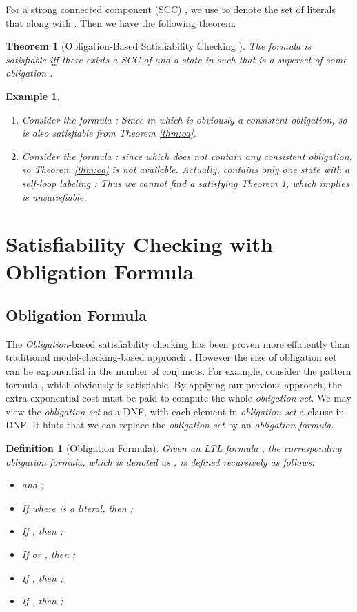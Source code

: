 \documentclass[conference]{IEEEtran}
\newtheorem{definition}{Definition}
\newtheorem{theorem}{Theorem}
\newtheorem{example}{Example}
\begin{document}
For a strong connected component (SCC) , we use  to denote the set of literals that along with . 
Then we have the following theorem:

\begin{theorem}[Obligation-Based Satisfiability Checking \cite{LZPVH13}]\label{thm:scc}
  The formula  is satisfiable iff there exists a SCC
   of  and a state  in  such that  is a
  superset of some obligation .
\end{theorem}

\begin{example}
  \begin{enumerate}
    \item Consider the formula : Since   in 
    which  is 
    obviously a consistent obligation, so  is also satisfiable from Theorem \ref{thm:oa}.
    \item Consider the formula : since 
     which does not contain any consistent obligation, so Theorem 
    \ref{thm:oa} is not available. Actually,  contains only one state  with a 
    self-loop labeling : Thus we cannot find a  satisfying Theorem \ref{thm:scc}, 
    which implies  is unsatisfiable. 
  \end{enumerate}
\end{example}


\section{Satisfiability Checking with Obligation Formula}\label{sec:of}

\subsection{Obligation Formula}


The \textit{Obligation}-based satisfiability checking has been proven more efficiently than 
traditional model-checking-based approach \cite{LZPVH13}. However the size of obligation set 
can be exponential in the number of conjuncts. 
For example, consider the pattern formula 
, which obviously is satisfiable. 
By applying our previous approach, the extra exponential cost must be paid to compute the 
whole \textit{obligation set}. We may view the \textit{obligation set} 
as a DNF, with  each element in \textit{obligation set} a clause in DNF. 
It hints that we can replace the \textit{obligation set} by an \textit{obligation formula}.

\begin{definition}[Obligation Formula]\label{def:of}
Given an LTL formula , the corresponding \textit{obligation formula}, 
which is denoted as , is defined recursively as follows:
     \begin{itemize}
       \item  and ;
       \item If  where  is a literal, then ;
       \item If , then ;
       \item If  or , then ;
       \item If , then ;
       \item If , then ;
     \end{itemize}
\end{definition}
\end{document}
